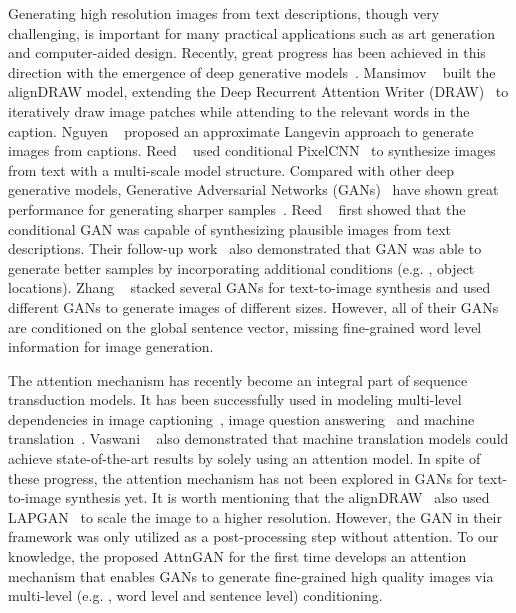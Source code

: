 Generating high resolution images from text descriptions, though very challenging, is important for many practical applications such as art generation and computer-aided design. Recently, great progress has been achieved in this direction with the emergence of deep generative models~\cite{KingmaW14, Oord16, goodfellow2014generative}. Mansimov \etal~\cite{MansimovPBS15} built the alignDRAW model, extending the Deep Recurrent Attention Writer (DRAW)~\cite{Gregor15DRAW} to iteratively draw image patches while attending to the relevant words in the caption. Nguyen \etal~\cite{NguyenYBDC17} proposed an approximate Langevin approach to generate images from captions.  Reed \etal~\cite{Reed17parallel} used conditional PixelCNN~\cite{Oord16} to synthesize images from text with a multi-scale model structure. Compared with other deep generative models, Generative Adversarial Networks (GANs)~\cite{goodfellow2014generative} have shown great performance for generating sharper samples~\cite{Radford15, DentonCSF15, Salimans2016, Christian2016, pix2pix2017}. Reed \etal~\cite{reed2016generative} first showed that the conditional GAN was capable of synthesizing plausible images from text descriptions. Their follow-up work~\cite{reed2016learning} also demonstrated that GAN was able to generate better samples by incorporating additional conditions (e.g. , object locations). Zhang \etal~\cite{Han16stackgan, Han17stackgan2} stacked several GANs for text-to-image synthesis and used different GANs to generate images of different sizes. However, all of their GANs are conditioned on the global sentence vector, missing fine-grained word level information for image generation.  

The attention mechanism has recently become an integral part of sequence transduction models. It has been successfully used in modeling multi-level dependencies in image captioning~\cite{XuBKCCSZB15}, image question answering~\cite{YangHGDS16} and machine translation~\cite{Dzmitry14}. Vaswani \etal~\cite{Ashish17} also demonstrated that machine translation models could achieve state-of-the-art results by solely using an attention model. In spite of these progress, the attention mechanism has not been explored in GANs for text-to-image synthesis yet. It is worth mentioning that the alignDRAW~\cite{MansimovPBS15} also used LAPGAN~\cite{DentonCSF15} to scale the image to a higher resolution. However, the GAN in their framework was only utilized as a post-processing step without attention.  To our knowledge, the proposed AttnGAN for the first time develops an attention mechanism that enables GANs to generate fine-grained high quality images via  multi-level (e.g. , word level and sentence level) conditioning. 

